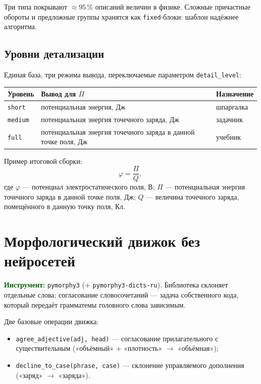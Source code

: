 \documentclass[12pt,a4paper]{article}
\newcommand{\idea}[1]{\textcolor{darkgreen}{\textbf{#1}}}
\begin{document}
Три типа покрывают $\approx 95\,\%$ описаний величин в физике. Сложные причастные обороты и предложные группы хранятся как \texttt{fixed}-блоки: шаблон надёжнее алгоритма.

\subsection{Уровни детализации}
Единая база, три режима вывода, переключаемые параметром \texttt{detail\_level}:
\begin{center}
\begin{tabular}{@{}lll@{}}
\toprule
\textbf{Уровень} & \textbf{Вывод для $\Pi$} & \textbf{Назначение} \\
\midrule
\texttt{short}  & потенциальная энергия, Дж & шпаргалка \\
\texttt{medium} & потенциальная энергия точечного заряда, Дж & задачник \\
\texttt{full}   & потенциальная энергия точечного заряда в данной точке поля, Дж & учебник \\
\bottomrule
\end{tabular}
\end{center}

Пример итоговой сборки:
\begin{equation*}
\varphi = \frac{\Pi}{Q},
\end{equation*}
где $\varphi$ --- потенциал электростатического поля, В; $\Pi$ --- потенциальная энергия точечного заряда в данной точке поля, Дж; $Q$ --- величина точечного заряда, помещённого в данную точку поля, Кл.

\section{Морфологический движок без нейросетей}

\idea{Инструмент:} \texttt{pymorphy3} (+ \texttt{pymorphy3-dicts-ru}). Библиотека склоняет отдельные слова; согласование словосочетаний --- задача собственного кода, который передаёт грамматемы головного слова зависимым.

Две базовые операции движка:
\begin{itemize}
  \item \texttt{agree\_adjective(adj, head)} --- согласование прилагательного с существительным («объёмный» + «плотность» $\to$ «объёмная»);
  \item \texttt{decline\_to\_case(phrase, case)} --- склонение управляемого дополнения («заряд» $\to$ «заряда»).
\end{itemize}
\end{document}
